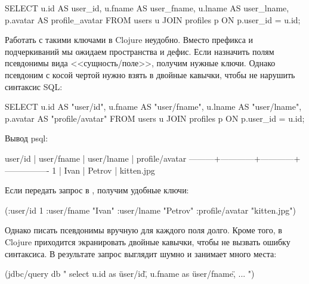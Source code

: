 \begin{english}
  \begin{sql}
SELECT
  u.id     AS user_id,
  u.fname  AS user_fname,
  u.lname  AS user_lname,
  p.avatar AS profile_avatar
FROM users u
JOIN profiles p ON p.user_id = u.id;
  \end{sql}
\end{english}

Работать с такими ключами в Clojure неудобно. Вместо префикса и подчеркиваний мы ожидаем пространства и дефис. Если назначить полям псевдонимы вида <<сущность/поле>>, получим нужные ключи. Однако псевдоним с косой чертой нужно взять в двойные кавычки, чтобы не нарушить синтаксис SQL:

\begin{english}
  \begin{sql}
SELECT
  u.id     AS "user/id",
  u.fname  AS "user/fname",
  u.lname  AS "user/lname",
  p.avatar AS "profile/avatar"
FROM users u
JOIN profiles p ON p.user_id = u.id;
  \end{sql}
\end{english}

Вывод psql:

\begin{english}
  \begin{text}
 user/id | user/fname | user/lname | profile/avatar
---------+------------+------------+----------------
       1 | Ivan       | Petrov     | kitten.jpg
  \end{text}
\end{english}

Если передать запрос в , получим удобные ключи:

\begin{english}
  \begin{clojure}
({:user/id 1
  :user/fname "Ivan"
  :user/lname "Petrov"
  :profile/avatar "kitten.jpg"})
  \end{clojure}
\end{english}

Однако писать псевдонимы вручную для каждого поля долго. Кроме того, в Clojure приходится экранировать двойные кавычки, чтобы не вызвать ошибку синтаксиса. В результате запрос выглядит шумно и занимает много места:

\begin{english}
  \begin{clojure}
(jdbc/query db "
select
u.id as \"user/id\",
u.fname as \"user/fname\",
...
")
  \end{clojure}
\end{english}

